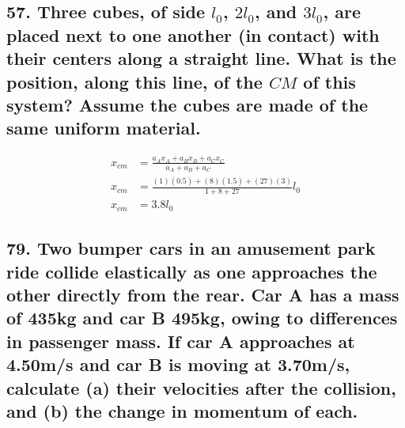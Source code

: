 \documentclass[12pt,a4paper,english]{article}
\begin{document}
\begin{flushleft}
  \subsection{57. Three cubes, of side $l_0$, $2l_0$, and $3l_0$, are placed next to one another (in contact) with their centers along a straight line. What is the position, along this line, of the $CM$ of this system? Assume the cubes are made of the same uniform material.}
  \begin{align*}
    x_{cm}&=\frac{a_Ax_A+a_Bx_B+a_Cx_C}{a_A+a_B+a_C}
    \\
    x_{cm}&=\frac{(1)(0.5)+(8)(1.5)+(27)(3)}{1+8+27}l_0
    \\
    x_{cm}&=3.8l_0
  \end{align*}
  \subsection{79. Two bumper cars in an amusement park ride collide elastically as one approaches the other directly from the rear. Car A has a mass of 435kg and car B 495kg, owing to differences in passenger mass. If car A approaches at 4.50m/s and car B is moving at 3.70m/s, calculate (a) their velocities after the collision, and (b) the change in momentum of each.}
  \begin{align*}
  \end{align*}
\end{flushleft}
\end{document}
